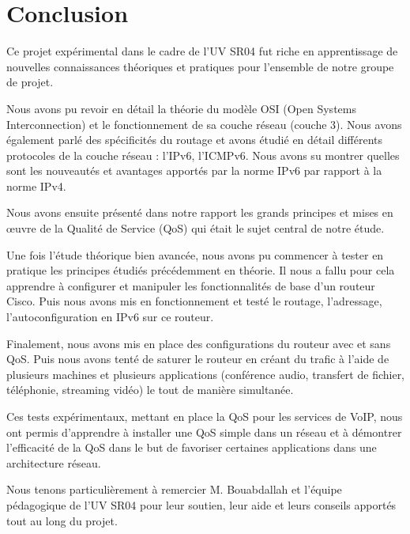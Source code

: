 \chapter{Conclusion}\label{ch:conclusion}

Ce projet expérimental dans le cadre de l'UV SR04 fut riche en apprentissage de nouvelles connaissances théoriques et pratiques pour l'ensemble de notre groupe de projet. 

Nous avons pu revoir en détail la théorie du modèle OSI (Open Systems Interconnection) et le fonctionnement de sa couche réseau (couche 3). Nous avons également parlé des spécificités du routage et avons étudié en détail différents protocoles de la couche réseau :  l'IPv6, l'ICMPv6. Nous avons su montrer quelles sont les nouveautés et avantages apportés par la norme IPv6 par rapport à la norme IPv4.

Nous avons ensuite présenté dans notre rapport les grands principes et mises en œuvre de la Qualité de Service (QoS) qui était le sujet central de notre étude.

Une fois l'étude théorique bien avancée, nous avons pu commencer à tester en pratique les principes étudiés précédemment en théorie. Il nous a fallu pour cela apprendre à configurer et manipuler les fonctionnalités de base d'un routeur Cisco. Puis nous avons mis en fonctionnement et testé le routage, l'adressage, l'autoconfiguration en IPv6 sur ce routeur.

Finalement, nous avons mis en place des configurations du routeur avec et sans QoS. Puis nous avons tenté de saturer le routeur en créant du trafic à l'aide de plusieurs machines et plusieurs applications (conférence audio, transfert de fichier, téléphonie, streaming vidéo) le tout de manière simultanée.

Ces tests expérimentaux, mettant en place la QoS pour les services de VoIP, nous ont permis d'apprendre à installer une QoS simple dans un réseau et à démontrer l'efficacité de la QoS dans le but de favoriser certaines applications dans une architecture réseau.

Nous tenons particulièrement à remercier M. Bouabdallah et l'équipe pédagogique de l'UV SR04 pour leur soutien, leur aide et leurs conseils apportés tout au long du projet.

